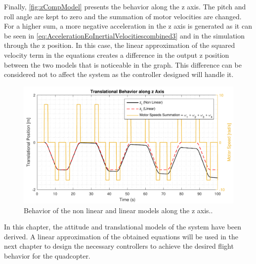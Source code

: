 Finally, \autoref{fig:zCompModel} presents the behavior along the z axis. The pitch and roll angle are kept to zero and the summation of motor velocities are changed. For a higher sum, a more negative acceleration in the z axis is generated as it can be seen in \autoref{eq:AccelerationEqInertialVelocitiescombined3} and in the simulation through the z position. In this case, the linear approximation of the squared velocity term in the equations creates a difference in the output z position between the two models that is noticeable in the graph. This difference can be considered not to affect the system as the controller designed will handle it.  
\begin{figure}[H]
	\centering
	\includegraphics[scale=0.65]{figures/zCompModel}
	\caption{Behavior of the non linear and linear models along the z axis..}
	\label{fig:zCompModel}
\end{figure}

In this chapter, the attitude and translational models of the system have been derived. A linear approximation of the obtained equations will be used in the next chapter to design the necessary controllers to achieve the desired flight behavior for the quadcopter.




